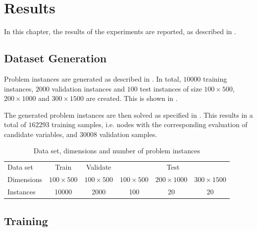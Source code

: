 \chapter{Results}\label{cha:results}

In this chapter, the results of the experiments are reported, as described in .


\section{Dataset Generation}

Problem instances are generated as described in . In total, $10000$ training instances, $2000$ validation instances and $ 100 $ test instances of size $100 \times 500$, $200 \times 1000$ and $300 \times 1500$ are created. This is shown in .

The generated problem instances are then solved as specified in . This results in a total of $162293$ training samples, i.e. nodes with the corresponding evaluation of candidate variables, and $30008$ validation samples. 

\begin{scriptsize}
\begin{table}[ht]
	\centering
	\begin{tabular}{lccccc}
		\toprule
		  Data set& \multicolumn{1}{c}{Train} & \multicolumn{1}{c}{Validate} & \multicolumn{3}{c}{Test}\\ \cmidrule(lr){2-2} \cmidrule(lr){3-3} \cmidrule(lr){4-6}
		  Dimensions & $100 \times 500$ & $100 \times 500$ & $100 \times 500$ & $200 \times 1000$ & $300 \times 1500$ \\
		\addlinespace
		Instances & 10000 &  2000  & 100 & 20 & 20 \\
		\bottomrule
	\end{tabular}
	\caption{Data set, dimensions and number of problem instances}\label{tab:instances}
\end{table}
\end{scriptsize}

\section{Training}

